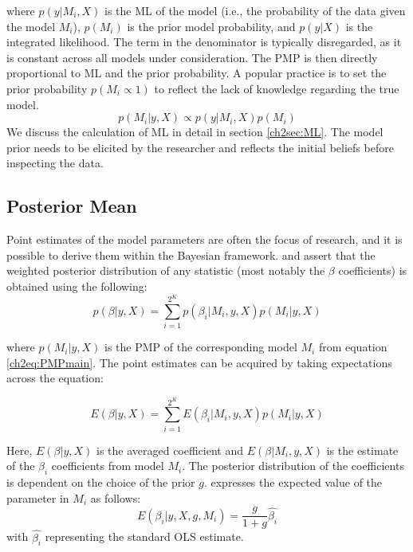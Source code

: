\begin{refsection}
where $p(y\vert M_{i},X)$ is the \ac{ML} of the model (i.e., the probability of the data given the model $M_{i}$), $p(M_{i})$ is the prior model probability, and $p(y\vert X)$ is the integrated likelihood. The term in the denominator is typically disregarded, as it is constant across all models under consideration. The PMP is then directly proportional to \ac{ML} and the prior probability. A popular practice is to set the prior probability $p(M_{i} \propto 1)$ to reflect the lack of knowledge regarding the true model.
\begin{equation}
	p(M_{i}\vert y,X) \propto p(y\vert M_{i},X)p(M_{i})
\end{equation}
%
We discuss the calculation of \ac{ML} in detail in section \ref{ch2sec:ML}. The model prior needs to be elicited by the researcher and reflects the initial beliefs before inspecting the data. 
%
\subsection{Posterior Mean}
Point estimates of the model parameters are often the focus of research, and it is possible to derive them within the Bayesian framework. \textcite{Zeugner2011} and \textcite{MoralBenito2012} assert that the weighted posterior distribution of any statistic (most notably the $\beta$ coefficients) is obtained using the following:
%
\begin{equation}\label{ch2eq:parest}
	p(\beta \vert y, X) = \sum_{i=1}^{2^{K}} p(\beta_{i} \vert M_{i},y,X)p(M_{i} \vert y,X)
\end{equation}

where $p(M_{i} \vert y, X)$ is the \ac{PMP} of the corresponding model $M_{i}$ from equation \ref{ch2eq:PMPmain}. The point estimates can be acquired by taking expectations across the equation:

\begin{equation}\label{ch2eq:pointparest}
	E(\beta \vert y, X) = \sum_{i=1}^{2^{K}} E(\beta_{i} \vert M_{i},y,X)p(M_{i} \vert y,X)
\end{equation}

Here, $E(\beta \vert y, X)$ is the averaged coefficient and $E(\beta \vert M_{i},y,X)$ is the estimate of the $\beta_{i}$ coefficients from model $M_{i}$. The posterior distribution of the coefficients is dependent on the choice of the prior $g$. \textcite{Zeugner2011} expresses the expected value of the parameter in $M_{i}$ as follows:
\begin{equation}\label{ch2eq:postdist}
	E(\beta_{i} \vert y,X,g,M_{i}) = \frac{g}{1+g}\hat{\beta_{i}}
\end{equation}
with $\hat{\beta_{i}}$ representing the standard \ac{OLS} estimate.


\end{refsection}
